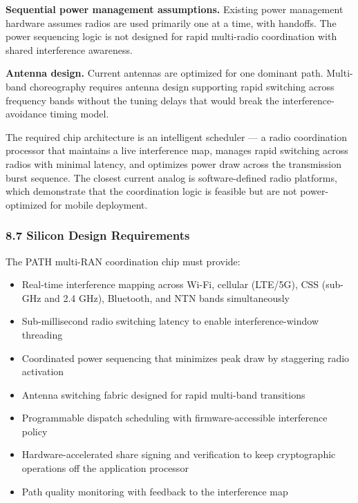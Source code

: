 \documentclass[
  11pt,
]{article}
\providecommand{\tightlist}{%
  \setlength{\itemsep}{0pt}\setlength{\parskip}{0pt}}
\begin{document}
\textbf{Sequential power management assumptions.} Existing power
management hardware assumes radios are used primarily one at a time,
with handoffs. The power sequencing logic is not designed for rapid
multi-radio coordination with shared interference awareness.

\textbf{Antenna design.} Current antennas are optimized for one dominant
path. Multi-band choreography requires antenna design supporting rapid
switching across frequency bands without the tuning delays that would
break the interference-avoidance timing model.

The required chip architecture is an intelligent scheduler --- a radio
coordination processor that maintains a live interference map, manages
rapid switching across radios with minimal latency, and optimizes power
draw across the transmission burst sequence. The closest current analog
is software-defined radio platforms, which demonstrate that the
coordination logic is feasible but are not power-optimized for mobile
deployment.

\hypertarget{silicon-design-requirements}{%
\subsubsection{8.7 Silicon Design
Requirements}\label{silicon-design-requirements}}

The PATH multi-RAN coordination chip must provide:

\begin{itemize}
\tightlist
\item
  Real-time interference mapping across Wi-Fi, cellular (LTE/5G), CSS
  (sub-GHz and 2.4 GHz), Bluetooth, and NTN bands simultaneously
\item
  Sub-millisecond radio switching latency to enable interference-window
  threading
\item
  Coordinated power sequencing that minimizes peak draw by staggering
  radio activation
\item
  Antenna switching fabric designed for rapid multi-band transitions
\item
  Programmable dispatch scheduling with firmware-accessible interference
  policy
\item
  Hardware-accelerated share signing and verification to keep
  cryptographic operations off the application processor
\item
  Path quality monitoring with feedback to the interference map
\end{itemize}
\end{document}

